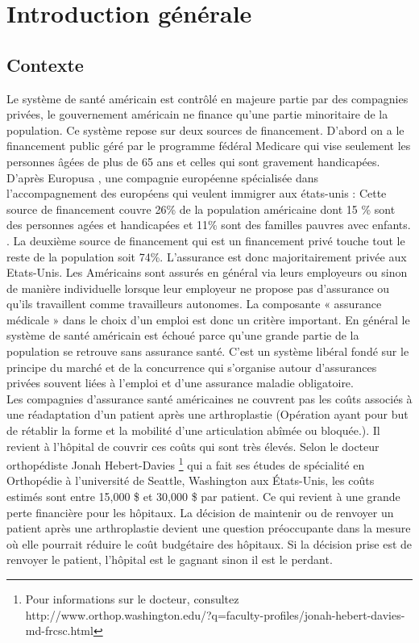 \documentclass[12pt, french]{report}
\begin{document}
\newpage
\chapter{Introduction générale}	
\section{Contexte}
Le système de santé américain est contrôlé en majeure partie par des compagnies privées, le gouvernement américain ne finance qu'une partie minoritaire de la population. Ce système  repose sur deux sources de financement. D'abord on a le financement public géré par le programme fédéral Medicare qui vise seulement les personnes âgées de plus de 65 ans et celles qui sont gravement handicapées. D'après Europusa \cite{key4}, une compagnie européenne spécialisée dans l'accompagnement des européens qui veulent immigrer aux états-unis : \guillemotleft Cette source de financement couvre 26\% de la population américaine dont 15 \% sont des personnes agées et handicapées et 11\% sont des familles pauvres avec enfants.  \guillemotright. La deuxième source de financement qui est un financement privé touche tout le reste de la population soit 74\%. L’assurance est donc majoritairement privée aux Etats-Unis. Les Américains sont assurés en général via leurs employeurs ou sinon de manière individuelle lorsque leur employeur ne propose pas d’assurance ou qu’ils travaillent comme travailleurs autonomes. La composante « 	assurance médicale » dans le choix d’un emploi est donc un critère important. En général le système de santé américain est échoué parce qu'une grande partie de la population se retrouve sans assurance santé. C'est un système libéral fondé sur le principe du marché et de la concurrence qui s’organise autour d’assurances privées souvent liées à l’emploi et d’une assurance maladie obligatoire. \\

Les compagnies d'assurance santé américaines ne couvrent pas les coûts associés à une réadaptation d'un patient après une arthroplastie (Opération ayant pour but de rétablir la forme et la mobilité d'une articulation abîmée ou bloquée.). Il revient à l'hôpital de couvrir ces coûts qui sont très élevés. Selon le docteur orthopédiste Jonah Hebert-Davies \footnote{Pour informations sur le docteur, consultez http://www.orthop.washington.edu/?q=faculty-profiles/jonah-hebert-davies-md-frcsc.html} qui a fait ses études de spécialité en Orthopédie à l'université de Seattle, Washington aux États-Unis, les coûts estimés sont entre 15,000 \$ et 30,000 \$ par patient. Ce qui revient à une grande perte financière pour les hôpitaux.  La décision de maintenir ou de renvoyer un patient après une arthroplastie devient une question préoccupante dans la mesure où elle pourrait réduire le coût budgétaire des hôpitaux. Si la décision prise est de renvoyer le patient, l'hôpital est le gagnant sinon il est le perdant. \\ 
\end{document}
